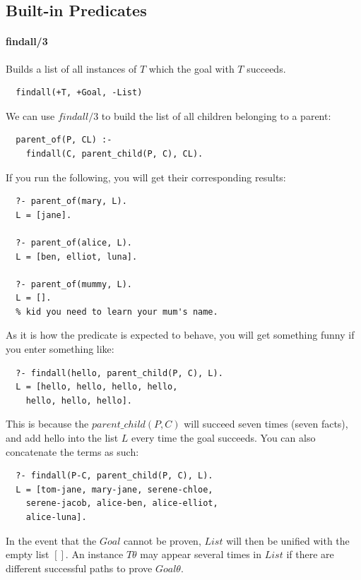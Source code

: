 \documentclass{article}
\begin{document}
\begin{multicols}{2}
  \subsection{Built-in Predicates}
  
  \paragraph{findall/3} Builds a list of all instances of $T$ which the goal with $T$ succeeds.
  
  \begin{lstlisting}
  findall(+T, +Goal, -List)
  \end{lstlisting}
  
  We can use $findall/3$ to build the list of all children belonging to a parent:

  \begin{lstlisting}
  parent_of(P, CL) :-
    findall(C, parent_child(P, C), CL).
  \end{lstlisting}
  
  If you run the following, you will get their corresponding results:
  
  \begin{lstlisting}
  ?- parent_of(mary, L).
  L = [jane].

  ?- parent_of(alice, L).
  L = [ben, elliot, luna].

  ?- parent_of(mummy, L).
  L = [].
  % kid you need to learn your mum's name.
  \end{lstlisting}

   As it is how the predicate is expected to behave, you will get something funny if you enter something like:
   
  \begin{lstlisting}
  ?- findall(hello, parent_child(P, C), L).
  L = [hello, hello, hello, hello,
    hello, hello, hello].
  \end{lstlisting}
  
  This is because the $parent\_child(P, C)$ will succeed seven times (seven facts), and add hello into the list $L$ every time the goal succeeds. You can also concatenate the terms as such:
  
  \begin{lstlisting}
  ?- findall(P-C, parent_child(P, C), L).
  L = [tom-jane, mary-jane, serene-chloe,
    serene-jacob, alice-ben, alice-elliot,
    alice-luna].
  \end{lstlisting}
  
  In the event that the $Goal$ cannot be proven, $List$ will then be unified with the empty list $[]$. An instance $T\theta$ may appear several times in $List$ if there are different successful paths to prove $Goal\theta$.
  

\end{multicols}
\end{document}
